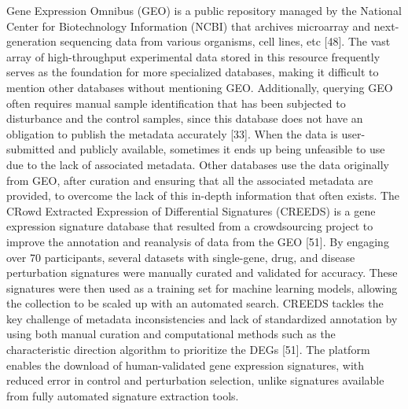 Gene Expression Omnibus (GEO) is a public repository managed by the National Center for Biotechnology Information (NCBI) that archives microarray and next-generation sequencing data from various organisms, cell lines, etc [48]. The vast array of high-throughput experimental data stored in this resource frequently serves as the foundation for more specialized databases, making it difficult to mention other databases without mentioning GEO. Additionally, querying GEO often requires manual sample identification that has been subjected to disturbance and the control samples, since this database does not have an obligation to publish the metadata accurately [33]. When the data is user-submitted and publicly available, sometimes it ends up being unfeasible to use due to the lack of associated metadata. Other databases use the data originally from GEO, after curation and ensuring that all the associated metadata are provided, to overcome the lack of this in-depth information that often exists. The CRowd Extracted Expression of Differential Signatures (CREEDS) is a gene expression signature database that resulted from a crowdsourcing project to improve the annotation and reanalysis of data from the GEO [51]. By engaging over 70 participants, several datasets with single-gene, drug, and disease perturbation signatures were manually curated and validated for accuracy. These signatures were then used as a training set for machine learning models, allowing the collection to be scaled up with an automated search. CREEDS tackles the key challenge of metadata inconsistencies and lack of standardized annotation by using both manual curation and computational methods such as the characteristic direction algorithm to prioritize the DEGs [51]. The platform enables the download of human-validated gene expression signatures, with reduced error in control and perturbation selection, unlike signatures available from fully automated signature extraction tools.
